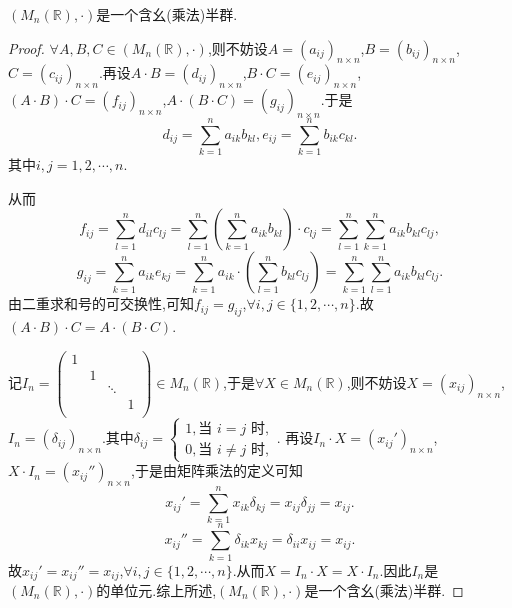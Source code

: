 \documentclass[../../main.tex]{subfiles}
\begin{document}
\begin{example}
$\left( M_n\left( \mathbb{R} \right) ,\cdot \right)$是一个含幺(乘法)半群.
\end{example}
\begin{proof}
\(\forall A,B,C\in (M_n(\mathbb{R}),\cdot)\),则不妨设\(A=(a_{ij})_{n\times n}\),\(B=(b_{ij})_{n\times n}\),\(C=(c_{ij})_{n\times n}\).再设\(A\cdot B=(d_{ij})_{n\times n}\),\(B\cdot C=(e_{ij})_{n\times n}\),\((A\cdot B)\cdot C=(f_{ij})_{n\times n}\),\(A\cdot (B\cdot C)=(g_{ij})_{n\times n}\).于是
\[
d_{ij}=\sum_{k = 1}^n{a_{ik}b_{kl}},e_{ij}=\sum_{k = 1}^n{b_{ik}c_{kl}}.
\]
其中\(i,j = 1,2,\cdots,n\).

从而
\[
f_{ij}=\sum_{l = 1}^n{d_{il}c_{lj}}=\sum_{l = 1}^n{\left(\sum_{k = 1}^n{a_{ik}b_{kl}}\right)\cdot c_{lj}}=\sum_{l = 1}^n{\sum_{k = 1}^n{a_{ik}b_{kl}c_{lj}}},
\]
\[
g_{ij}=\sum_{k = 1}^n{a_{ik}e_{kj}}=\sum_{k = 1}^n{a_{ik}\cdot\left(\sum_{l = 1}^n{b_{kl}c_{lj}}\right)}=\sum_{k = 1}^n{\sum_{l = 1}^n{a_{ik}b_{kl}c_{lj}}}.
\]
由二重求和号的可交换性,可知\(f_{ij}=g_{ij}\),\(\forall i,j\in \{1,2,\cdots,n\}\).故\((A\cdot B)\cdot C = A\cdot (B\cdot C)\).

记\(I_n=\begin{pmatrix}
1 & & & \\
& 1 & & \\
& & \ddots & \\
& & & 1\\
\end{pmatrix}\in M_n(\mathbb{R})\),于是\(\forall X\in M_n(\mathbb{R})\),则不妨设\(X=(x_{ij})_{n\times n}\),\(I_n = (\delta_{ij})_{n\times n}\).其中\(\delta_{ij}=\begin{cases}
1,\text{当 }i = j\text{ 时},\\
0,\text{当 }i\neq j\text{ 时},
\end{cases}\).
再设\(I_n\cdot X=(x_{ij}')_{n\times n}\),\(X\cdot I_n=(x_{ij}'')_{n\times n}\),于是由矩阵乘法的定义可知
\[
x_{ij}'=\sum_{k = 1}^n{x_{ik}\delta_{kj}}=x_{ij}\delta_{jj}=x_{ij}.
\]
\[
x_{ij}''=\sum_{k = 1}^n{\delta_{ik}x_{kj}}=\delta_{ii}x_{ij}=x_{ij}.
\]
故\(x_{ij}'=x_{ij}''=x_{ij}\),\(\forall i,j\in \{1,2,\cdots,n\}\).从而\(X = I_n\cdot X = X\cdot I_n\).因此\(I_n\)是\((M_n(\mathbb{R}),\cdot)\)的单位元.综上所述,$\left( M_n\left( \mathbb{R} \right) ,\cdot \right)$是一个含幺(乘法)半群.
\end{proof}
\end{document}
